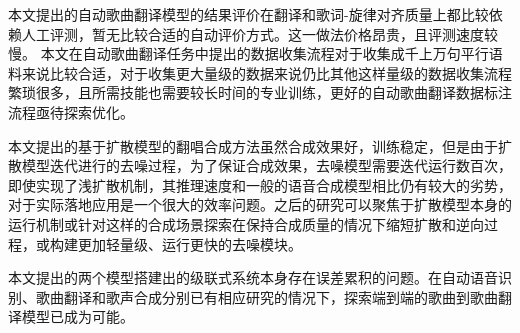 本文提出的自动歌曲翻译模型的结果评价在翻译和歌词-旋律对齐质量上都比较依赖人工评测，暂无比较合适的自动评价方式。这一做法价格昂贵，且评测速度较慢。
本文在自动歌曲翻译任务中提出的数据收集流程对于收集成千上万句平行语料来说比较合适，对于收集更大量级的数据来说仍比其他这样量级的数据收集流程繁琐很多，且所需技能也需要较长时间的专业训练，更好的自动歌曲翻译数据标注流程亟待探索优化。

本文提出的基于扩散模型的翻唱合成方法虽然合成效果好，训练稳定，但是由于扩散模型迭代进行的去噪过程，为了保证合成效果，去噪模型需要迭代运行数百次，即使实现了浅扩散机制，其推理速度和一般的语音合成模型相比仍有较大的劣势，对于实际落地应用是一个很大的效率问题。之后的研究可以聚焦于扩散模型本身的运行机制或针对这样的合成场景探索在保持合成质量的情况下缩短扩散和逆向过程，或构建更加轻量级、运行更快的去噪模块。

本文提出的两个模型搭建出的级联式系统本身存在误差累积的问题。在自动语音识别、歌曲翻译和歌声合成分别已有相应研究的情况下，探索端到端的歌曲到歌曲翻译模型已成为可能。

